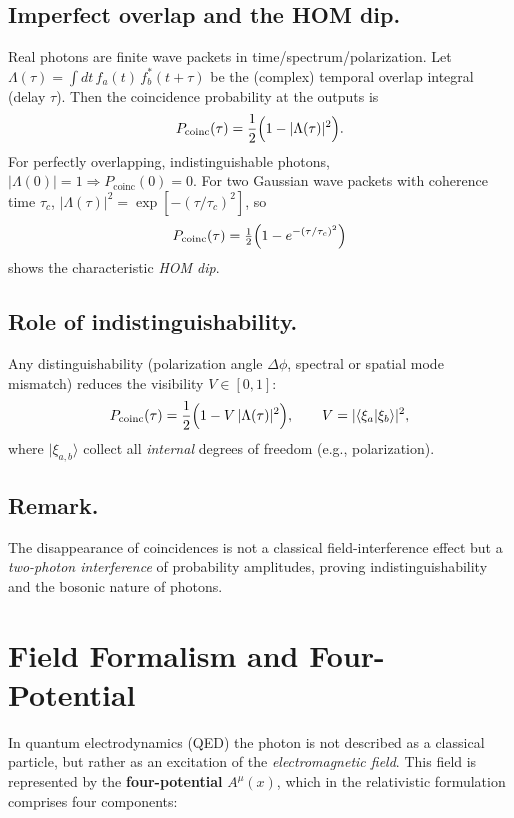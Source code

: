 \subsection*{Imperfect overlap and the HOM dip.}
Real photons are finite wave packets in time/spectrum/polarization. Let
\(\Lambda(\tau)=\int\!dt\, f_a(t)\,f_b^*(t+\tau)\)
be the (complex) temporal overlap integral (delay \(\tau\)).
Then the coincidence probability at the outputs is
\[
P_{\text{coinc}}(\tau)=\frac{1}{2}\Bigl(1-|\Lambda(\tau)|^2\Bigr).
\]
For perfectly overlapping, indistinguishable photons, \(|\Lambda(0)|=1\Rightarrow P_{\text{coinc}}(0)=0\).
For two Gaussian wave packets with coherence time \(\tau_c\),
\(|\Lambda(\tau)|^2=\exp[-(\tau/\tau_c)^2]\),
so
\[
P_{\text{coinc}}(\tau)=\tfrac{1}{2}\Bigl(1-e^{-(\tau/\tau_c)^2}\Bigr)
\]
shows the characteristic \emph{HOM dip}.

\subsection*{Role of indistinguishability.}
Any distinguishability (polarization angle \(\Delta\phi\), spectral or spatial mode mismatch) reduces the visibility \(V\in[0,1]\):
\[
P_{\text{coinc}}(\tau)=\frac{1}{2}\Bigl(1- V\,|\Lambda(\tau)|^2\Bigr),
\qquad
V=|\langle \xi_a|\xi_b\rangle|^2,
\]
where \(|\xi_{a,b}\rangle\) collect all \emph{internal} degrees of freedom (e.g., polarization).

\subsection*{Remark.}
The disappearance of coincidences is not a classical field-interference effect but a \emph{two-photon interference} of probability amplitudes, proving indistinguishability and the bosonic nature of photons.
\section{Field Formalism and Four-Potential}
\label{anhangA:feldformalismus}
\label{anhangA:viererpotential} %

In quantum electrodynamics (QED) the photon is not described as a classical particle,
but rather as an excitation of the \emph{electromagnetic field}. 
This field is represented by the \textbf{four-potential} \( A^\mu(x) \),
which in the relativistic formulation comprises four components:

